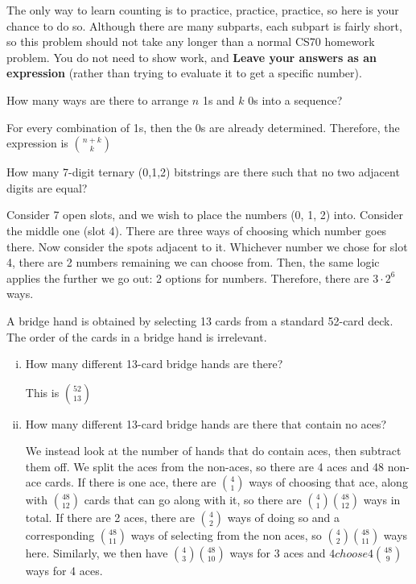 \documentclass[11pt]{article}
\begin{document}
The only way to learn counting is to practice, practice, practice, so
here is your chance to do so. Although there are many subparts, each subpart is fairly short, so this problem should not take any longer than a normal CS70 homework problem. You do not need to show work, and
\textbf{Leave your answers as an expression} (rather than
trying to evaluate it to get a specific number).
\begin{Parts}

\Part How many ways are there to arrange $n$ 1s and $k$ 0s into a sequence?

\begin{solution}
  For every combination of 1s, then the 0s are already determined. Therefore, the expression is ${n + k \choose k}$
\end{solution}

\Part How many 7-digit ternary (0,1,2) bitstrings are there such that no two adjacent digits are equal?

\begin{solution}
  Consider 7 open slots, and we wish to place the numbers (0, 1, 2) into. Consider the middle one (slot 4). There are three ways of choosing which number goes there. Now consider the spots adjacent to it. Whichever number we chose for slot 4, there are 2 numbers remaining we can choose from. Then, the same logic applies the further we go out: 2 options for numbers. Therefore, there are $3 \cdot 2^6$ ways.
\end{solution}

\Part A bridge hand is obtained by selecting 13 cards from a standard
  52-card deck. The order of the cards in a bridge hand is
  irrelevant.
  \begin{enumerate}[i.]
    \item How many different 13-card bridge hands are there? 

    \begin{solution}
      This is $52 \choose 13$
    \end{solution}
    \item How many different 13-card bridge hands are there that contain no aces? 

    \begin{solution}
      We instead look at the number of hands that do contain aces, then subtract them off. We split the aces from the non-aces, so there are 4 aces and 48 non-ace cards. If there is one ace, there are $4 \choose 1$ ways of choosing that ace, along with $48 \choose 12$ cards that can go along with it, so there are ${4\choose 1}{48\choose 12}$ ways in total. If there are 2 aces, there are $4 \choose 2$ ways of doing so and a corresponding $48 \choose 11$ ways of selecting from the non aces, so ${4\choose 2}{48 \choose 11}$ ways here. Similarly, we then have ${4 \choose 3}{48 \choose 10}$ ways for 3 aces and ${4 choose 4}{48 \choose 9}$ ways for 4 aces. 


\end{solution}
\end{enumerate}
\end{Parts}
\end{document}
